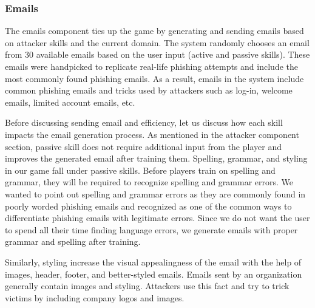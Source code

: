 \subsubsection{Emails}
The emails component ties up the game by generating and sending emails based on attacker skills and the current domain. The system randomly chooses an email from 30 available emails based on the user input (active and passive skills). These emails were handpicked to replicate real-life phishing attempts and include the most commonly found phishing emails. As a result, emails in the system include common phishing emails and tricks used by attackers such as log-in, welcome emails, limited account emails, etc.


Before discussing sending email and efficiency, let us discuss how each skill impacts the email generation process. As mentioned in the attacker component section, passive skill does not require additional input from the player and improves the generated email after training them. Spelling, grammar, and styling in our game fall under passive skills. Before players train on spelling and grammar, they will be required to recognize spelling and grammar errors. We wanted to point out spelling and grammar errors as they are commonly found in poorly worded phishing emails and recognized as one of the common ways to differentiate phishing emails with legitimate errors. Since we do not want the user to spend all their time finding language errors, we generate emails with proper grammar and spelling after training.

Similarly, styling increase the visual appealingness of the email with the help of images, header, footer, and better-styled emails. Emails sent by an organization generally contain images and styling. Attackers use this fact and try to trick victims by including company logos and images.

